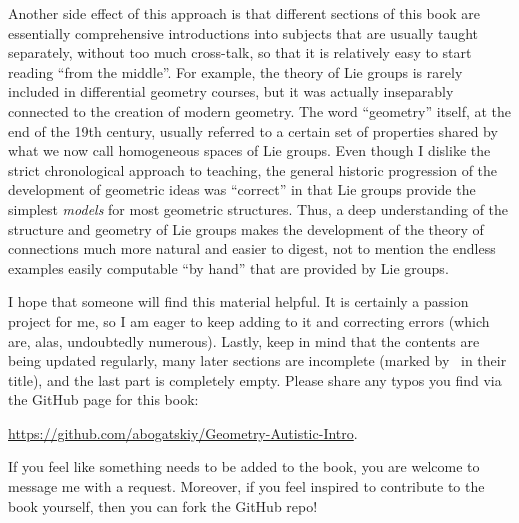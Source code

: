 Another side effect of this approach is that different sections of this book are essentially comprehensive introductions into subjects that are usually taught separately, without too much cross-talk, so that it is relatively easy to start reading ``from the middle''. For example, the theory of Lie groups is rarely included in differential geometry courses, but it was actually inseparably connected to the creation of modern geometry. The word ``geometry'' itself, at the end of the 19th century, usually referred to a certain set of properties shared by what we now call homogeneous spaces of Lie groups. Even though I dislike the strict chronological approach to teaching, the general historic progression of the development of geometric ideas was ``correct'' in that Lie groups provide the simplest \emph{models} for most  geometric structures. Thus, a deep understanding of the structure and geometry of Lie groups makes the development of the theory of connections much more natural and easier to digest, not to mention the endless examples easily computable ``by hand'' that are provided by Lie groups.

I hope that someone will find this material helpful. It is certainly a passion project for me, so I am eager to keep adding to it and correcting errors (which are, alas, undoubtedly numerous). Lastly, keep in mind that the contents are being updated regularly, many later sections are incomplete (marked by \ucmark\ in their title), and the last part is completely empty. Please share any typos you find via the GitHub page for this book:
\begin{center}
    \url{https://github.com/abogatskiy/Geometry-Autistic-Intro}.
\end{center}
If you feel like something needs to be added to the book, you are welcome to message me with a request. Moreover, if you feel inspired to contribute to the book yourself, then you can fork the GitHub repo!